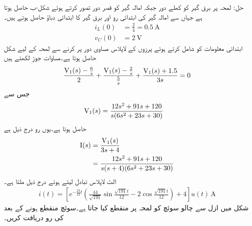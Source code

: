 حل: لمحہ  پر برق گیر کو کھلے دور جبکہ امالہ گیر کو قصر دور تصور کرتے ہوئے شکل-ب حاصل ہوتا ہے جہاں سے امالہ گیر کی ابتدائی رو  اور برق گیر کا ابتدائی دباؤ  حاصل ہوتے ہیں۔
\begin{align*}
i_L(0)&=\frac{2}{4}=\SI{0.5}{\ampere}\\
v_C(0)&=\SI{2}{\volt}
\end{align*}
ابتدائی معلومات کو شامل کرتے ہوئے پرزوں کے لاپلاس مساوی دور پر کرنے سے  لمحہ  کے لیے شکل حاصل ہوتا ہے۔مساوات جوڑ لکھتے ہیں
\begin{align*}
\frac{{{\textup{V}}}_1(s)-\frac{6}{s}}{2}+\frac{{{\textup{V}}}_1(s)-\frac{2}{s}}{\frac{5}{s}}+\frac{{{\textup{V}}}_1(s)+1.5}{3s}=0
\end{align*}
جس سے 
\begin{align*}
{\ensuremath{{\textup{V}}}}_1(s)&=\frac{12s^2+91s+120}{s(6s^2+23s+30)}
\end{align*}
حاصل ہوتا ہے۔یوں رو درج ذیل ہے
\begin{align*}
{\ensuremath{{\textup{I}}}}(s)&=\frac{{{\textup{V}}}_1(s)}{3s+4}\\
&=\frac{12s^2+91s+120}{s(s+4)(6s^2+23s+30)}
\end{align*}
الٹ لاپلاس تبادل لیتے ہوئے درج ذیل ملتا ہے۔
\begin{align*}
i(t)=\left[e^{-\frac{23}{12}t}\left(\frac{44}{\sqrt{191}} \sin \frac{\sqrt{191} t}{12}-2\cos\frac{\sqrt{191} t}{12} \right)+4\right]u(t)\,\si{\ampere}
\end{align*}
شکل  میں ازل سے چالو سوئچ کو لمحہ  پر منقطع کیا جاتا ہے۔سوئچ منقطع ہونے کے بعد کی رو  دریافت کریں۔

